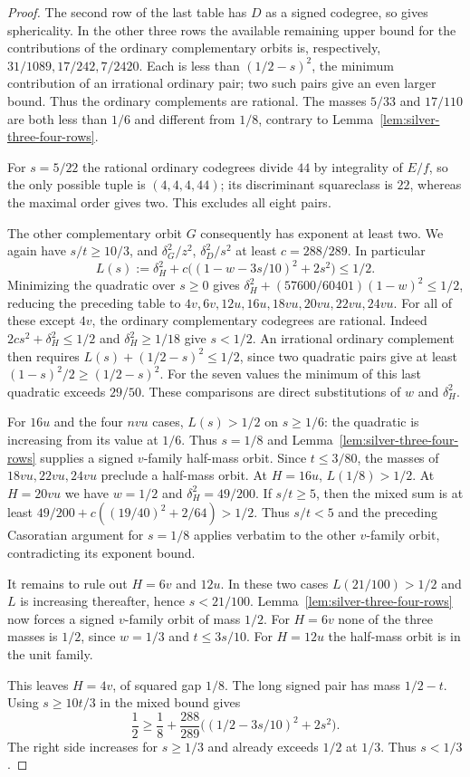 \documentclass[11pt,reqno]{amsart}
\theoremstyle{remark}\newtheorem{remark}[theorem]{Remark}
\numberwithin{equation}{section}
\begin{document}
\begin{proof}
The second row of the last table has $D$ as a signed codegree,
so gives sphericality. In the other three rows the available
remaining upper bound for the contributions of the ordinary complementary orbits is, respectively,
$31/1089,17/242,7/2420$. Each is less than $(1/2-s)^2$,
the minimum contribution of an irrational ordinary pair; two such
pairs give an even larger bound. Thus the ordinary complements
are rational. The masses $5/33$ and $17/110$ are both less than $1/6$ and
different from $1/8$, contrary to Lemma~\ref{lem:silver-three-four-rows}.

For $s=5/22$ the
rational ordinary codegrees divide $44$ by integrality of $E/f$,
so the only possible tuple is $(4,4,4,44)$; its discriminant
squareclass is $22$, whereas the maximal order gives two.
This excludes all eight pairs.

The other complementary orbit $G$ consequently has exponent at
least two. We again have $s/t\ge10/3$, and $\delta_G^2/z^2$,
$\delta_D^2/s^2$ at least $c=288/289$. In particular
\[
 L(s):=\delta_H^2+c\bigl((1-w-3s/10)^2+2s^2\bigr)\le1/2 .
\]
Minimizing the quadratic over $s\ge0$ gives
$\delta_H^2+(57600/60401)(1-w)^2\le1/2$, reducing the preceding
table to $4v,6v,12u,16u,18vu,20vu,22vu,24vu$.
For all of these except $4v$, the ordinary complementary codegrees
are rational. Indeed $2cs^2+\delta_H^2\le1/2$ and
$\delta_H^2\ge1/18$ give $s<1/2$. An irrational ordinary complement
then requires $L(s)+(1/2-s)^2\le1/2$, since two quadratic pairs
give at least $(1-s)^2/2\ge(1/2-s)^2$.
For the seven values the minimum of this last quadratic exceeds
$29/50$. These comparisons are direct substitutions of $w$ and
$\delta_H^2$.

For $16u$ and the four $nvu$ cases, $L(s)>1/2$ on $s\ge1/6$:
the quadratic is increasing from its value at $1/6$.
Thus $s=1/8$ and Lemma~\ref{lem:silver-three-four-rows}
supplies a signed $v$-family half-mass orbit. Since $t\le3/80$, the masses
of $18vu,22vu,24vu$ preclude a half-mass orbit. At $H=16u$,
$L(1/8)>1/2$. At $H=20vu$ we have $w=1/2$ and
$\delta_H^2=49/200$. If $s/t\ge5$, then the mixed sum is at least
$49/200+c((19/40)^2+2/64)>1/2$. Thus $s/t<5$ and the preceding
Casoratian argument for $s=1/8$ applies verbatim to the other
$v$-family orbit, contradicting its exponent bound.

It remains to rule out $H=6v$ and $12u$. In these two cases
$L(21/100)>1/2$ and $L$ is increasing thereafter, hence $s<21/100$.
Lemma~\ref{lem:silver-three-four-rows} now forces a signed
$v$-family orbit of mass $1/2$. For $H=6v$ none of the three
masses is $1/2$, since $w=1/3$ and $t\le3s/10$.
For $H=12u$ the half-mass orbit is in the unit family.

This leaves $H=4v$, of squared gap $1/8$. The long signed
pair has mass $1/2-t$. Using $s\ge10t/3$ in the mixed bound gives
\[
 \frac12\ge\frac18+\frac{288}{289}
          \bigl((1/2-3s/10)^2+2s^2\bigr).
\]
The right side increases for $s\ge1/3$ and already exceeds $1/2$
at $1/3$. Thus $s<1/3$.
\end{proof}
\end{document}
